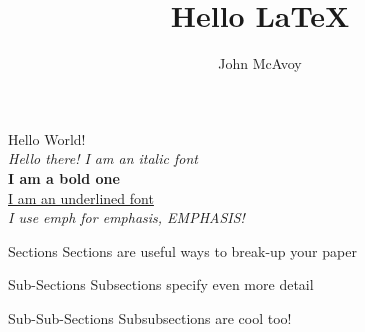 \documentclass{refman}
\title{Hello {\LaTeX}}
\author{John McAvoy}
\begin{document}
\maketitle
\tableofcontents

Hello World!\\

\textit{Hello there! I am an italic font}\\
\textbf{I am a bold one}\\
\underline{I am an underlined font}\\
\emph{I use emph for emphasis, EMPHASIS!}\\

\begin{section}{Sections}
  Sections are useful ways to break-up your paper

  \begin{subsection}{Sub-Sections}
    Subsections specify even more detail

    \begin{subsubsection}{Sub-Sub-Sections}
      Subsubsections are cool too!
    \end{subsubsection}

  \end{subsection}

\end{section}
\end{document}
